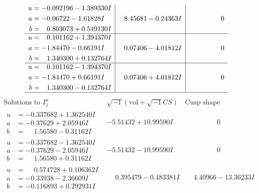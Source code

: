 \documentclass[1p]{elsarticle_modified}
\theoremstyle{definition}
\newcommand{\I}{\sqrt{-1}}
\begin{document}
$$\begin{array}{c|c|c}
\begin{aligned}
u &= -0.092196 - 1.389330 I \\
a &= -0.06722 - 1.61828 I \\
b &= \phantom{-}0.803073 + 0.549130 I\end{aligned}
 & \phantom{-}8.45681 - 0.24363 I & \phantom{-0.000000 } 0 \\ \hline\begin{aligned}
u &= \phantom{-}0.101162 + 1.394370 I \\
a &= -1.84470 - 0.66191 I \\
b &= \phantom{-}1.340300 + 0.132764 I\end{aligned}
 & \phantom{-}0.07406 - 4.01812 I & \phantom{-0.000000 } 0 \\ \hline\begin{aligned}
u &= \phantom{-}0.101162 - 1.394370 I \\
a &= -1.84470 + 0.66191 I \\
b &= \phantom{-}1.340300 - 0.132764 I\end{aligned}
 & \phantom{-}0.07406 + 4.01812 I & \phantom{-0.000000 } 0\\
 \hline 
 \end{array}$$\newpage$$\begin{array}{c|c|c}  
\text{Solutions to }I^u_{1}& \I (\text{vol} + \sqrt{-1}CS) & \text{Cusp shape}\\
 \hline 
\begin{aligned}
u &= -0.337682 + 1.362540 I \\
a &= -0.37629 + 2.05946 I \\
b &= \phantom{-}1.56580 - 0.31162 I\end{aligned}
 & -5.51432 + 10.99590 I & \phantom{-0.000000 } 0 \\ \hline\begin{aligned}
u &= -0.337682 - 1.362540 I \\
a &= -0.37629 - 2.05946 I \\
b &= \phantom{-}1.56580 + 0.31162 I\end{aligned}
 & -5.51432 - 10.99590 I & \phantom{-0.000000 } 0 \\ \hline\begin{aligned}
u &= \phantom{-}0.574728 + 0.106362 I \\
a &= -0.33938 - 2.36609 I \\
b &= -0.116893 + 0.292931 I\end{aligned}
 & \phantom{-}0.395479 - 0.483381 I & \phantom{-}4.40966 - 13.36233 I \\ \hline\begin{aligned}

\end{aligned}
\end{array}$$
\end{document}
